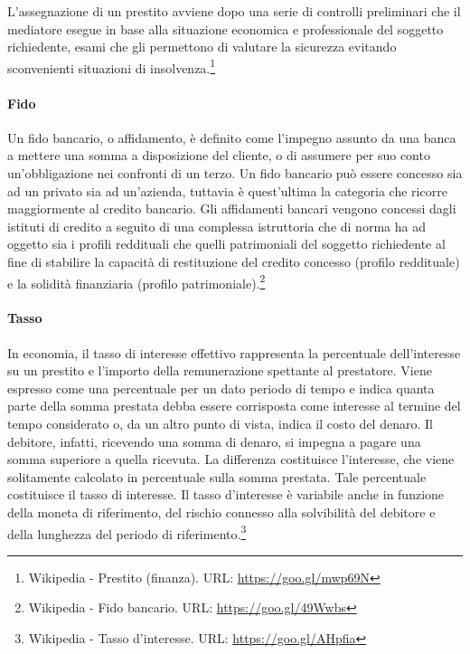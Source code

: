 L'assegnazione di un prestito avviene dopo una serie di controlli preliminari che il mediatore esegue in base alla situazione economica e professionale del soggetto richiedente, esami che gli permettono di valutare la sicurezza evitando sconvenienti situazioni di insolvenza.\footnote{Wikipedia - Prestito (finanza). URL: \url{https://goo.gl/mwp69N}}

\paragraph{Fido}
Un fido bancario, o affidamento, è definito come l'impegno assunto da una banca a mettere una somma a disposizione del cliente, o di assumere per suo conto un'obbligazione nei confronti di un terzo. Un fido bancario può essere concesso sia ad un privato sia ad un'azienda, tuttavia è quest'ultima la categoria che ricorre maggiormente al credito bancario. Gli affidamenti bancari vengono concessi dagli istituti di credito a seguito di una complessa istruttoria che di norma ha ad oggetto sia i profili reddituali che quelli patrimoniali del soggetto richiedente al fine di stabilire la capacità di restituzione del credito concesso (profilo reddituale) e la solidità finanziaria (profilo patrimoniale).\footnote{Wikipedia - Fido bancario. URL: \url{https://goo.gl/49Wwbs}}

\paragraph{Tasso}
In economia, il tasso di interesse effettivo rappresenta la percentuale dell'interesse su un prestito e l'importo della remunerazione spettante al prestatore. Viene espresso come una percentuale per un dato periodo di tempo e indica quanta parte della somma prestata debba essere corrisposta come interesse al termine del tempo considerato o, da un altro punto di vista, indica il costo del denaro. Il debitore, infatti, ricevendo una somma di denaro, si impegna a pagare una somma superiore a quella ricevuta. La differenza costituisce l'interesse, che viene solitamente calcolato in percentuale sulla somma prestata. Tale percentuale costituisce il tasso di interesse. Il tasso d'interesse è variabile anche in funzione della moneta di riferimento, del rischio connesso alla solvibilità del debitore e della lunghezza del periodo di riferimento.\footnote{Wikipedia - Tasso d'interesse. URL: \url{https://goo.gl/AHpfia}}

